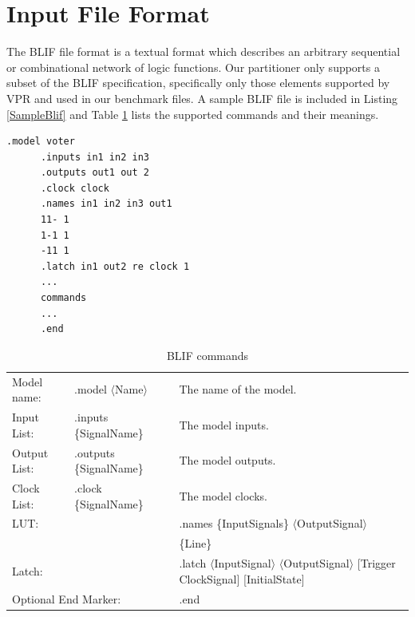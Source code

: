 \documentclass[12pt,final,oneside]{dwThesis} %
\begin{document}
   \section{Input File Format}
   \label{secBlif} The \gls{BLIF} file format is a
   textual format which describes an arbitrary sequential or combinational
   network of logic functions\cite{BLIF}.  Our partitioner only supports a
   subset of the \gls{BLIF} specification, specifically only those elements
   supported by \gls{VPR} and used in our benchmark files.
   A sample \gls{BLIF} file is included in Listing \ref{SampleBlif} and 
   Table \ref{BLIFCommands} lists the supported commands and their meanings.
\begin{table}
      \begin{center}
   \begin{lstlisting}[caption=BLIF file layout, label=SampleBlif]
   .model voter
      .inputs in1 in2 in3
      .outputs out1 out 2
      .clock clock
      .names in1 in2 in3 out1
      11- 1
      1-1 1
      -11 1
      .latch in1 out2 re clock 1
      ...  
      commands 
      ...  
      .end
   \end{lstlisting}
\end{center}\end{table}


\begin{table}
      \begin{center}
   \begin{tabular}
      {lll} Model name: & .model $\langle$Name$\rangle$ & The name
      of the model.\\
      Input List: & .inputs \{SignalName\} & The model inputs.\\

      Output List:& .outputs \{SignalName\} & The model outputs.\\
      Clock List: &
      .clock \{SignalName\} & The model clocks.\\

      \multicolumn{2}{l}{\gls{LUT}:} & .names \{InputSignals\}
      $\langle$OutputSignal$\rangle$\\
      &&\{Line\}\\
      \multicolumn{2}{l}{Latch:}
      & .latch $\langle$InputSignal$\rangle$ $\langle$OutputSignal$\rangle$
      [Trigger ClockSignal] [InitialState]\\
      \multicolumn{2}{l}{Optional End Marker:} &
      .end 
   \end{tabular}
   \caption{\gls{BLIF} commands}\label{BLIFCommands}
\end{center}\end{table}
\end{document}
